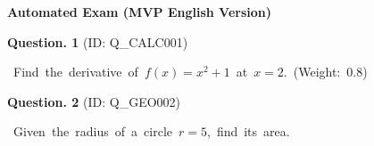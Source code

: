 \documentclass[12pt, a4paper]{article}
\begin{document}
\begin{center}
    \textbf{\Large Automated Exam (MVP English Version)} 
\end{center}
\vspace{0.5cm}

\vspace{0.5cm}
\noindent\textbf{\large Question. 1} (ID: Q_CALC001)\par 
\noindent
\hbox{
Find the derivative of $f(x)=x^2+1$ at $x=2$. (Weight: 0.8)
}
\vspace{0.5cm}


\vspace{0.5cm}
\noindent\textbf{\large Question. 2} (ID: Q_GEO002)\par 
\noindent
\hbox{
Given the radius of a circle $r=5$, find its area.
}
\vspace{0.5cm}
\end{document}

